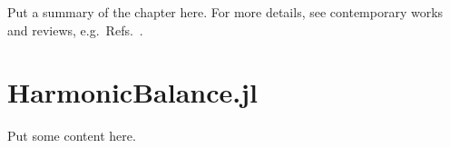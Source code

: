 
\label{ch:spatial}


\begin{chapterabstract}
Put a summary of the chapter here.
%
\tcblower
%
For more details, see contemporary works and reviews, e.g.\ 
Refs.~\cite{CarrKaxiras2020NatRevMat,BistritzerMacDonald2011PNASUSA,MoonKoshino2012PRB,WallbankFalKo2015AP}.
\end{chapterabstract}

\section{HarmonicBalance.jl}
\label{sec:hb_code}

Put some content here.





